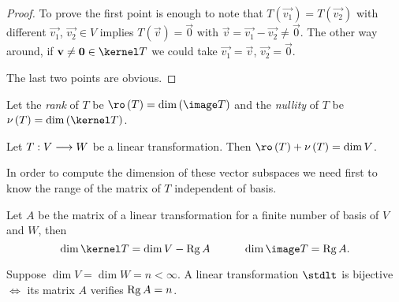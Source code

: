 \begin{proof}
    To prove the first point is enough to note that $T\left( \vec{v_1} \right) = T\left( \vec{v_2} \right)$
    with different $\vec{v_1}$, $\vec{v_2}\in V$ implies $T\left( \vec{v} \right) = \vec{0}$ with $\vec{v} =
    \vec{v_1} - \vec{v_2}\neq \vec{0}$. The other way around, if $\vec{v} \neq\vec{0}\in\kernel T$ we could
    take $\vec{v_1} = \vec{v}$, $\vec{v_2} = \vec{0}$.

    The last two points are obvious.
\end{proof}

\begin{defi}
    Let the \textit{rank} of $T$ be $\ro\left( T \right) = \dim \left( \image T \right)$ and the
    \textit{nullity} of $T$ be $\nu\left( T \right) = \dim\left( \kernel T \right) $.
\end{defi}

\begin{theorem}
    Let $T : V\longrightarrow W$ be a linear transformation. Then $\ro\left( T\right) + \nu\left( T \right) = \dim V$.
\end{theorem}

In order to compute the dimension of these vector subspaces we need first to know the range of the matrix
of $T$ independent of basis.

\begin{prop}
    Let $A$ be the matrix of a linear transformation \stdlt for a finite number of basis of $V$ and $W$,
    then
    \begin{equation}
        \dim \kernel T = \dim V - \rg A \quad\quad\quad \dim\image T = \rg A.
    \end{equation}
\end{prop}

\begin{coro}
    Suppose $\dim V = \dim W = n < \infty$. A linear transformation $\stdlt$ is bijective $\iff$ its
        matrix $A$ verifies $\operatorname{Rg} A = n$.
\end{coro}

